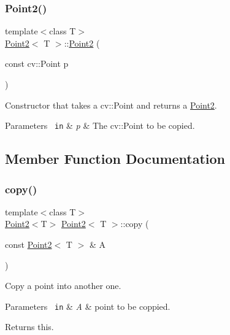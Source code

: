 \subsubsection{\texorpdfstring{Point2()}{Point2()}\hspace{0.1cm}{\footnotesize\ttfamily [3/3]}}
{\footnotesize\ttfamily template$<$class T$>$ \\
\mbox{\hyperlink{class_point2}{Point2}}$<$ T $>$\+::\mbox{\hyperlink{class_point2}{Point2}} (\begin{DoxyParamCaption}\item[{const cv\+::\+Point}]{p }\end{DoxyParamCaption})\hspace{0.3cm}{\ttfamily [inline]}}



Constructor that takes a cv\+::\+Point and returns a \mbox{\hyperlink{class_point2}{Point2}}. 


\begin{DoxyParams}[1]{Parameters}
\mbox{\texttt{ in}}  & {\em p} & The cv\+::\+Point to be copied. \\
\hline
\end{DoxyParams}


\subsection{Member Function Documentation}
\mbox{\label{class_point2_abf5cfefe8e75dda02f681fc8d74c2c39}} 
\subsubsection{\texorpdfstring{copy()}{copy()}}
{\footnotesize\ttfamily template$<$class T$>$ \\
\mbox{\hyperlink{class_point2}{Point2}}$<$T$>$ \mbox{\hyperlink{class_point2}{Point2}}$<$ T $>$\+::copy (\begin{DoxyParamCaption}\item[{const \mbox{\hyperlink{class_point2}{Point2}}$<$ T $>$ \&}]{A }\end{DoxyParamCaption})\hspace{0.3cm}{\ttfamily [inline]}}



Copy a point into another one. 


\begin{DoxyParams}[1]{Parameters}
\mbox{\texttt{ in}}  & {\em A} & point to be coppied. \\
\hline
\end{DoxyParams}
\begin{DoxyReturn}{Returns}
this. 
\end{DoxyReturn}
\mbox{\label{class_point2_a5f50f8f110af78415a56b0c32c2c8b8f}} 
